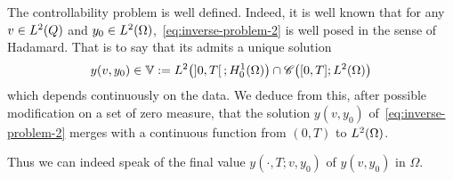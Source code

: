 \begin{remarque}%
    The controllability problem is well defined. Indeed, it is well known
    that for any $v\in L^{2}\!\left({Q}\right)$ and
    $y_{0}\in L^{2}\!\left({\Omega}\right)$,~\eqref{eq:inverse-problem-2} is well posed in
    the sense of Hadamard. That is to say that its admits a unique solution
    \begin{equation*}\label{eq:well-posedness-heat-equation}
        y\!\left({v,y_{0}}\right)\in \Vbb := \Ldeux{%
            \left]{0,T}\right[; H_{0}^{1}(\Omega)
        }\cap \Cscr\!\left({[0,T];\Ldeux{\Omega}}\right)
    \end{equation*}
    which depends continuously on the data. We deduce from this, after
    possible modification on a set of zero measure, that the solution
    $y\!\left({v,y_{0}}\right)$ of~\eqref{eq:inverse-problem-2} merges with
    a continuous function from $(0,T)$ to $L^{2}\!\left({\Omega}\right)$.

    Thus we can indeed speak of the final value
    $y\!\left({\cdot,T;v,y_{0}}\right)$ of $y\!\left({v,y_{0}}\right)$ in
    $\Omega$.
\end{remarque}

